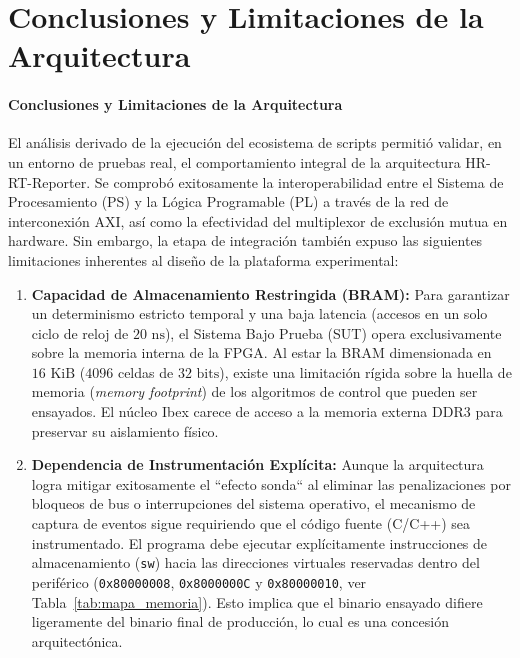 \chapter{Conclusiones y Limitaciones de la Arquitectura}
\subsubsection{Conclusiones y Limitaciones de la Arquitectura}
\label{sssec:conclusion_arquitectura}

El análisis derivado de la ejecución del ecosistema de scripts permitió validar, en un entorno de pruebas real, el comportamiento integral de la arquitectura HR-RT-Reporter. Se comprobó exitosamente la interoperabilidad entre el Sistema de Procesamiento (PS) y la Lógica Programable (PL) a través de la red de interconexión AXI, así como la efectividad del multiplexor de exclusión mutua en hardware. Sin embargo, la etapa de integración también expuso las siguientes limitaciones inherentes al diseño de la plataforma experimental:

\begin{enumerate}
    \item \textbf{Capacidad de Almacenamiento Restringida (BRAM):} Para garantizar un determinismo estricto temporal y una baja latencia (accesos en un solo ciclo de reloj de $20\text{ ns}$), el Sistema Bajo Prueba (SUT) opera exclusivamente sobre la memoria interna de la FPGA. Al estar la BRAM dimensionada en $16\text{ KiB}$ ($4096$ celdas de $32\text{ bits}$), existe una limitación rígida sobre la huella de memoria (\textit{memory footprint}) de los algoritmos de control que pueden ser ensayados. El núcleo Ibex carece de acceso a la memoria externa DDR3 para preservar su aislamiento físico.
    
    \item \textbf{Dependencia de Instrumentación Explícita:} Aunque la arquitectura logra mitigar exitosamente el ``efecto sonda`` al eliminar las penalizaciones por bloqueos de bus o interrupciones del sistema operativo, el mecanismo de captura de eventos sigue requiriendo que el código fuente (C/C++) sea instrumentado. El programa debe ejecutar explícitamente instrucciones de
    almacenamiento (\texttt{sw}) hacia las direcciones virtuales
    reservadas dentro del periférico (\texttt{0x80000008},
    \texttt{0x8000000C} y \texttt{0x80000010}, ver
    Tabla~\ref{tab:mapa_memoria}). Esto implica que el binario ensayado
    difiere ligeramente del binario final de producción, lo cual es una concesión arquitectónica.

    \end{enumerate}


